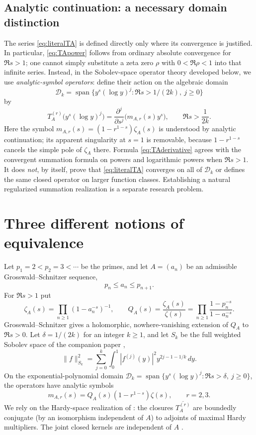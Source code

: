 \documentclass[12pt,letterpaper]{article}
\numberwithin{equation}{section}
\theoremstyle{remark}
\newcommand{\D}{\mathcal D}
\begin{document}
\subsection{Analytic continuation: a necessary domain distinction}
The series \eqref{eq:literalTA} is defined directly only where its
convergence is justified.  In particular, \eqref{eq:TApower} follows
from ordinary absolute convergence for $\Re s>1$; one cannot simply
substitute a zeta zero $\rho$ with $0<\Re\rho<1$ into that infinite
series.  Instead, in the Sobolev-space operator theory developed below,
we use \emph{analytic-symbol operators}: define their action on the
algebraic domain
\[
 \mathcal D_k=\operatorname{span}\{y^s(\log y)^j:\Re s>1/(2k),\ j\ge0\}
\]
by
\begin{equation}\label{eq:TAderivative}
 \boxed{\displaystyle
 T_A^{(r)}\big(y^s(\log y)^j\big)
 =\frac{\partial^j}{\partial s^j}
       \big(m_{A,r}(s)y^s\big),\qquad \Re s>\frac1{2k}.}
\end{equation}
Here the symbol $m_{A,r}(s)=(1-r^{1-s})\zeta_A(s)$ is understood by
analytic continuation; its apparent singularity at $s=1$ is removable,
because $1-r^{1-s}$ cancels the simple pole of $\zeta_A$ there.
Formula \eqref{eq:TAderivative} agrees with the convergent summation
formula on powers and logarithmic powers when $\Re s>1$.
It does \emph{not}, by itself, prove that \eqref{eq:literalTA}
converges on all of $\mathcal D_k$ or defines the same closed operator
on larger function classes.  Establishing a natural regularized
summation realization is a separate research problem.

\section{Three different notions of equivalence}\label{sec:three}
Let $p_1=2<p_2=3<\cdots$ be the primes, and let $A=(a_n)$ be an admissible Grosswald--Schnitzer sequence,
\begin{equation}\label{eq:admissible}
 p_n\le a_n\le p_{n+1}.
\end{equation}
For $\Re s>1$ put
\begin{equation}\label{eq:Q}
 \zeta_A(s)=\prod_{n\ge1}(1-a_n^{-s})^{-1},\qquad
 Q_A(s)=\frac{\zeta_A(s)}{\zeta(s)}
 =\prod_{n\ge1}\frac{1-p_n^{-s}}{1-a_n^{-s}}.
\end{equation}
Grosswald--Schnitzer \cite{GS78} gives a holomorphic, nowhere-vanishing extension of $Q_A$ to $\Re s>0$. Let $\delta=1/(2k)$ for an integer $k\ge1$, and let $S_k$ be the full weighted Sobolev space of the companion paper \cite{GS26},
\[
 \|f\|_{S_k}^2=\sum_{j=0}^k\int_0^1|f^{(j)}(y)|^2y^{2j-1-1/k}\,dy.
\]
On the exponential-polynomial domain $\D_k=\operatorname{span}\{y^s(\log y)^j:\Re s>\delta,\ j\ge0\}$, the operators have analytic symbols
\begin{equation}\label{eq:symbol}
 m_{A,r}(s)=Q_A(s)(1-r^{1-s})\zeta(s),\qquad r=2,3.
\end{equation}
We rely on the Hardy-space realization of \cite[Section~5]{GS26}: the closures $\overline{T_A^{(r)}}$ are boundedly conjugate (by an isomorphism independent of $A$) to adjoints of maximal Hardy multipliers. The joint closed kernels are independent of $A$ \cite[Theorem~2.1]{GS26}.
\end{document}
